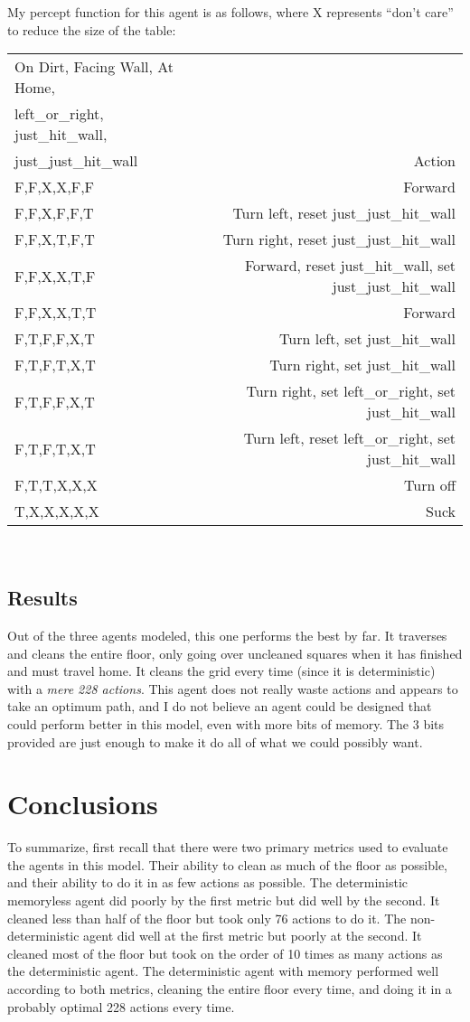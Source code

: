 \documentclass[10 pt.]{article}
\begin{document}
My percept function for this agent is as follows, where X represents ``don't care'' to reduce the size of the table:

\begin{tabular}{ l r }
On Dirt, Facing Wall, At Home,\\
left\_or\_right, just\_hit\_wall,\\
just\_just\_hit\_wall & Action \\
F,F,X,X,F,F & Forward\\
F,F,X,F,F,T & Turn left, reset just\_just\_hit\_wall\\
F,F,X,T,F,T & Turn right, reset just\_just\_hit\_wall\\
F,F,X,X,T,F & Forward, reset just\_hit\_wall, set just\_just\_hit\_wall\\
F,F,X,X,T,T & Forward\\
F,T,F,F,X,T & Turn left, set just\_hit\_wall\\
F,T,F,T,X,T & Turn right, set just\_hit\_wall\\
F,T,F,F,X,T & Turn right, set left\_or\_right, set just\_hit\_wall\\
F,T,F,T,X,T & Turn left, reset left\_or\_right, set just\_hit\_wall\\
F,T,T,X,X,X & Turn off\\
T,X,X,X,X,X & Suck\\
\end{tabular}\\

\subsection{Results}
Out of the three agents modeled, this one performs the best by far. It traverses and cleans the entire floor, only going
over uncleaned squares when it has finished and must travel home. It cleans the grid every time (since it is deterministic)
with a \emph{mere 228 actions}. This agent does not really waste actions and appears to take an optimum path,
and I do not believe an agent could be designed that could perform better in this model, even with more bits of memory.
The 3 bits provided are just enough to make it do all of what we could possibly want.
\section{Conclusions}
To summarize, first recall that there were two primary metrics used to evaluate the agents in this model. Their ability to clean as 
much of the floor as possible, and their ability to do it in as few actions as possible. The deterministic memoryless agent did poorly by the
first metric but did well by the second. It cleaned less than half of the floor but took only 76 actions to do it. The non-deterministic
agent did well at the first metric but poorly at the second. It cleaned most of the floor but took on the order of 10 times as many actions as
the deterministic agent. The deterministic agent with memory performed well according to both metrics, cleaning the entire floor every time,
and doing it in a probably optimal 228 actions every time.
\end{document}

